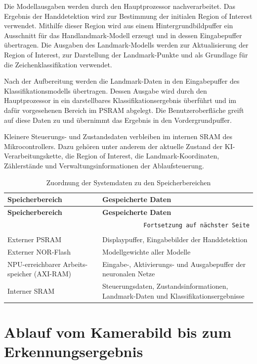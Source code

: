 Die Modellausgaben werden durch den Hauptprozessor nachverarbeitet. Das Ergebnis der Handdetektion wird zur Bestimmung der initialen Region of Interest verwendet. Mithilfe dieser Region wird aus einem Hintergrundbildpuffer ein Ausschnitt für das Handlandmark-Modell erzeugt und in dessen Eingabepuffer übertragen. Die Ausgaben des Landmark-Modells werden zur Aktualisierung der Region of Interest, zur Darstellung der Landmark-Punkte und als Grundlage für die Zeichenklassifikation verwendet.

Nach der Aufbereitung werden die Landmark-Daten in den Eingabepuffer des Klassifikationsmodells übertragen. Dessen Ausgabe wird durch den Hauptprozessor in ein darstellbares Klassifikationsergebnis überführt und im dafür vorgesehenen Bereich im PSRAM abgelegt. Die Benutzeroberfläche greift auf diese Daten zu und übernimmt das Ergebnis in den Vordergrundpuffer.

Kleinere Steuerungs- und Zustandsdaten verbleiben im internen SRAM des Mikrocontrollers. Dazu gehören unter anderem der aktuelle Zustand der KI-Verarbeitungskette, die Region of Interest, die Landmark-Koordinaten, Zählerstände und Verwaltungsinformationen der Ablaufsteuerung.

\begin{longtable}[H]{|p{}|p{}|}
    \hline
    \textbf{Speicherbereich} & \textbf{Gespeicherte Daten} \\
    \hline
    \endfirsthead
    \hline
    \textbf{Speicherbereich} & \textbf{Gespeicherte Daten} \\
    \hline
    \endhead
    \hline
    \multicolumn{2}{r}{\texttt{Fortsetzung auf nächster Seite}} \\
    \endfoot
    \caption{Zuordnung der Systemdaten zu den Speicherbereichen}
    \label{tab:speicherzuordnung} \\
    \endlastfoot
    Externer PSRAM & Displaypuffer, Eingabebilder der Handdetektion \\
    \hline
    Externer NOR-Flash & Modellgewichte aller Modelle \\
    \hline
    NPU-erreichbarer Arbeits-speicher (AXI-RAM) & Eingabe-, Aktivierungs- und Ausgabepuffer der neuronalen Netze \\
    \hline
    Interner SRAM & Steuerungsdaten, Zustandsinformationen, Landmark-Daten und Klassifikationsergebnisse \\
    \hline
\end{longtable}

\section{Ablauf vom Kamerabild bis zum Erkennungsergebnis}\label{sec:ablauft}

